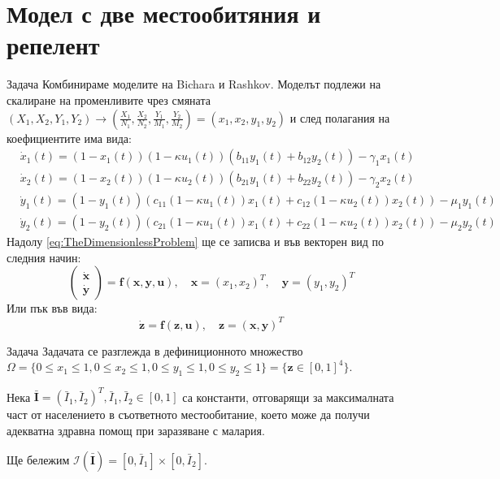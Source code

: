 \section{Модел с две местообитяния и репелент}
\begin{frame}[t]{Задача}
  Комбинираме моделите на Bichara и Rashkov.
  Моделът подлежи на скалиране на променливите чрез смяната $(X_1, X_2, Y_1, Y_2) \rightarrow (\frac{X_1}{N_1}, \frac{X_2}{N_2}, \frac{Y_1}{M_1}, \frac{Y_2}{M_2}) = (x_1, x_2, y_1, y_2)$ и след полагания на коефициентите има вида:
  \begin{equation}
    \label{eq:TheDimensionlessProblem}
    \begin{split}
      &\dot{x}_1(t) = (1-x_1(t)) (1-\kappa u_1(t)) \left(b_{11} y_1(t) + b_{12} y_2(t)\right) - \gamma_1 x_1(t) \\
      &\dot{x}_2(t) = (1-x_2(t)) (1-\kappa u_2(t))\left(b_{21} y_1(t) + b_{22} y_2(t)\right) - \gamma_2 x_2(t) \\
      &\dot{y}_1(t) = (1-y_1(t)) \left(c_{11}(1-\kappa u_1(t)) x_1(t) + c_{12}(1-\kappa u_2(t)) x_2(t)\right) - \mu_1 y_1(t) \\
      &\dot{y}_2(t) = (1-y_2(t)) \left(c_{21}(1-\kappa u_1(t)) x_1(t) + c_{22} (1-\kappa u_2(t)) x_2(t)\right) - \mu_2 y_2(t)
    \end{split}
  \end{equation}
  Надолу \eqref{eq:TheDimensionlessProblem} ще се записва и във векторен вид по следния начин:
  \begin{equation}
    \begin{pmatrix}
      \dot{\boldsymbol{x}} \\
      \dot{\boldsymbol{y}}
    \end{pmatrix}
    =
    \boldsymbol{f}(\boldsymbol{x}, \boldsymbol{y}, \boldsymbol{u}), \quad
    \boldsymbol{x} = (x_1, x_2)^T, \quad \boldsymbol{y} = (y_1, y_2)^T
  \end{equation}
  Или пък във вида:
  \begin{equation}
    \dot{\boldsymbol{z}} = \boldsymbol{f}(\boldsymbol{z}, \boldsymbol{u}), \quad \boldsymbol{z} = (\boldsymbol{x}, \boldsymbol{y})^T
  \end{equation}
\end{frame}

\begin{frame}{Задача}
  Задачата се разглежда в дефиниционното множество $\Omega = \{0 \leq x_1 \leq 1, 0 \leq x_2 \leq 1, 0 \leq y_1 \leq 1, 0 \leq y_2 \leq 1\} = \{\boldsymbol{z} \in [0, 1]^4\}$.

  Нека $\bar{\boldsymbol{I}} = (\bar{I}_1, \bar{I}_2)^T, \bar{I}_1, \bar{I}_2 \in [0, 1]$ са константи, отговарящи за максималната част от населението в съответното местообитание, което може да получи адекватна здравна помощ при заразяване с малария.

  Ще бележим $\mathscr{I}(\bar{\boldsymbol{I}}) = [0, \bar{I}_1] \times [0, \bar{I}_2]$.
\end{frame}

